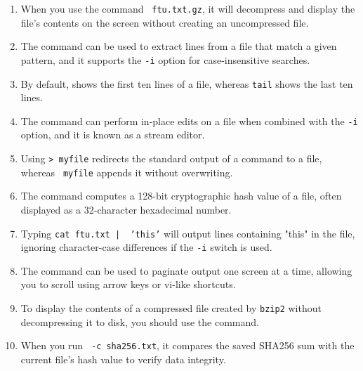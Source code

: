 \documentclass[a4paper]{report}
\begin{document}
\begin{enumerate}[1.]
    \item When you use the command \texttt{\underline{\hspace{2cm}} ftu.txt.gz}, it will decompress and display the file’s contents on the screen without creating an uncompressed file.
    
    \item The command \texttt{\underline{\hspace{2cm}}} can be used to extract lines from a file that match a given pattern, and it supports the \texttt{-i} option for case-insensitive searches.
    
    \item By default, \texttt{\underline{\hspace{2cm}}} shows the first ten lines of a file, whereas \texttt{tail} shows the last ten lines.
    
    \item The command \texttt{\underline{\hspace{2cm}}} can perform in-place edits on a file when combined with the \texttt{-i} option, and it is known as a stream editor.
    
    \item Using \texttt{> myfile} redirects the standard output of a command to a file, whereas \texttt{\underline{\hspace{2cm}} myfile} appends it without overwriting.
    
    \item The command \texttt{\underline{\hspace{2cm}}} computes a 128-bit cryptographic hash value of a file, often displayed as a 32-character hexadecimal number.
    
    \item Typing \texttt{cat ftu.txt | \underline{\hspace{2cm}} 'this'} will output lines containing "this" in the file, ignoring character-case differences if the \texttt{-i} switch is used.
    
    \item The command \texttt{\underline{\hspace{2cm}}} can be used to paginate output one screen at a time, allowing you to scroll using arrow keys or vi-like shortcuts.
    
    \item To display the contents of a compressed file created by \texttt{bzip2} without decompressing it to disk, you should use the \texttt{\underline{\hspace{2cm}}} command.
    
    \item When you run \texttt{\underline{\hspace{2cm}} -c sha256.txt}, it compares the saved SHA256 sum with the current file’s hash value to verify data integrity.
    \end{enumerate}
\newpage
\end{document}
